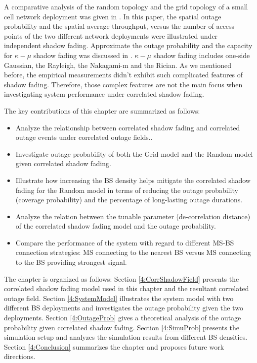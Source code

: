  
 
 \par A comparative analysis of the random topology and the grid topology of a small cell network deployment was given in \cite{chen2012small}. In this paper, the spatial outage probability and the spatial average throughput, versus the number of access points of the two different network deployments were illustrated under independent shadow fading. Approximate the outage probability and the capacity for $\kappa-\mu$ shadow fading was discussed in \cite{kumar2015approximate}. $\kappa-\mu$ shadow fading includes one-side Gaussian, the Rayleigh, the Nakagami-m and the Rician. As we mentioned before, the empirical measurements didn't exhibit such complicated features of shadow fading. Therefore, those complex features are not the main focus when investigating system performance under correlated shadow fading.
 \par The key contributions of this chapter are summarized as follows:
 \begin{itemize}
 \item Analyze the relationship between correlated shadow fading and correlated outage events under correlated outage fields.. 
 \item Investigate outage probability of both the Grid model and the Random model given correlated shadow fading.
 \item Illustrate how increasing the BS density helps mitigate the correlated shadow fading for the Random model in terms of reducing the outage probability (coverage probability) and the percentage of long-lasting outage durations.
 \item Analyze the relation between the tunable parameter (de-correlation distance) of the correlated shadow fading model and the outage probability.
 \item Compare the performance of the system with regard to different MS-BS connection strategies: MS connecting to the nearest BS versus MS connecting to the BS providing strongest signal.
 \end{itemize}
 The chapter is organized as follows: Section \ref{4:CorrShadowField} presents the correlated shadow fading model used in this chapter and the resultant correlated outage field. Section \ref{4:SystemModel} illustrates the system model with two different BS deployments and investigates the outage probability given the two deployments. Section \ref{4:OutageProb} gives a theoretical analysis of the outage probability given correlated shadow fading. Section \ref{4:SimuProb} presents the simulation setup and analyzes the simulation results from different BS densities. Section \ref{4:Conclusion} summarizes the chapter and proposes future work directions.
 
